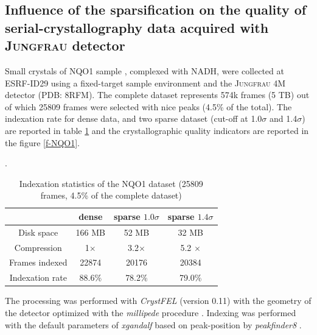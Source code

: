 \documentclass[preprint]{iucr}              %
\begin{document}
\subsection{Influence of the sparsification on the quality of serial-crystallography data acquired with \textsc{Jungfrau} detector}
Small crystals of NQO1 sample \cite{NQO1}, complexed with NADH, were collected at ESRF-ID29 using a fixed-target sample environment and the \textsc{Jungfrau} 4M detector (PDB: 8RFM). 
The complete dataset represents 574k frames (5 TB) out of which 25809 frames were selected with nice peaks (4.5\% of the total).
The indexation rate for dense data, and two sparse dataset (cut-off at 1.0$\sigma$ and 1.4$\sigma$) are reported in table \ref{t-NQO1} and the crystallographic quality indicators are reported in the figure \ref{f-NQO1}. 

\begin{table}
\label{t-NQO1}
\begin{center}
\caption{Indexation statistics of the NQO1 dataset (25809 frames, 4.5\% of the complete dataset)}.
\begin{tabular}{|c|c | c | c |} 
\hline
       & dense & sparse $1.0\sigma$ & sparse $1.4\sigma$ \\ 
\hline
Disk space & 166 MB & 52 MB & 32 MB \\
Compression & 1$\times$ & 3.2$\times$ & 5.2 $\times$ \\
Frames indexed  & 22874 & 20176 & 20384 \\
Indexation rate & 88.6\%& 78.2\% & 79.0\%\\
\hline
\end{tabular}
\end{center}
\end{table}

The processing was performed with \textit{CrystFEL} \cite{CrystFEL} (version 0.11) with the geometry of the detector optimized with the \textit{millipede} procedure \cite{millepede, millepede2}. 
Indexing was performed with the default parameters of \textit{xgandalf} \cite{xgandalf} based on peak-position by \textit{peakfinder8} \cite{Cheetah2014}.
\end{document}
